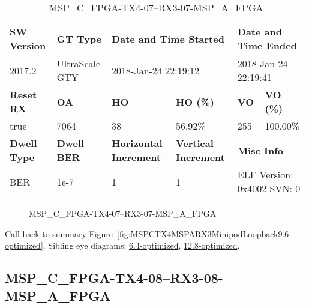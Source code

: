 \begin{table}[h]
\centering
\caption{MSP\_C\_FPGA-TX4-07--RX3-07-MSP\_A\_FPGA}
\label{tab:MSPCFPGATX407RX307MSPAFPGA9.6-optimized}
\begin{tabular}{@{}|l|l|l|l|l|l|@{}}
\toprule
\textbf{SW Version}                & \textbf{GT Type}   & \multicolumn{2}{l|}{\textbf{Date and Time Started}}            & \multicolumn{2}{l|}{\textbf{Date and Time Ended}}        \\ \midrule
2017.2                       & UltraScale GTY          & \multicolumn{2}{l|}{2018-Jan-24 22:19:12}                   & \multicolumn{2}{l|}{2018-Jan-24 22:19:41}               \\ \midrule
\textbf{Reset RX}                  & \textbf{OA} & \textbf{HO}   & \textbf{HO (\%)} & \textbf{VO} & \textbf{VO (\%)} \\ \midrule
true & 7064        & 38          & 56.92\%        & 255        & 100.00\%       \\ \midrule
\textbf{Dwell Type}                & \textbf{Dwell BER} & \textbf{Horizontal Increment} & \textbf{Vertical Increment}    & \multicolumn{2}{l|}{\textbf{Misc Info}}                  \\ \midrule
BER                            & 1e-7        & 1        & 1           & \multicolumn{2}{l|}{ELF Version: 0x4002 SVN: 0}                         \\ \bottomrule
\end{tabular}
\end{table}

\begin{figure}[h]
\caption{MSP\_C\_FPGA-TX4-07--RX3-07-MSP\_A\_FPGA} \label{fig:MSPCFPGATX407RX307MSPAFPGA9.6-optimized}
\end{figure}

Call back to summary Figure~\ref{fig:MSPCTX4MSPARX3MinipodLoopback9.6-optimized}.
Sibling eye diagrams: \hyperref[sec:MSPCFPGATX407RX307MSPAFPGA6.4-optimized]{6.4-optimized}, \hyperref[sec:MSPCFPGATX407RX307MSPAFPGA12.8-optimized]{12.8-optimized}.

\clearpage
\newpage


\subsection{MSP\_C\_FPGA-TX4-08--RX3-08-MSP\_A\_FPGA}\label{sec:MSPCFPGATX408RX308MSPAFPGA9.6-optimized}

